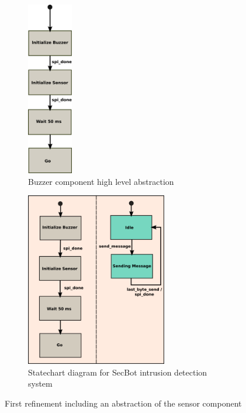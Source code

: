 \begin{figure}[t!]
    \begin{centering}
	    \begin{subfigure}[t]{0.5\textwidth}
	        \begin{centering}
	        \includegraphics[height=3in]{figures/Buzzer}
	        \caption{Buzzer component high level abstraction}
	        \label{fig:Buzzer}
	        \end{centering}
	    \end{subfigure}

	    \begin{subfigure}[t]{0.5\textwidth}
	        \begin{centering}
	        \includegraphics[height=3in]{figures/Buzzer&Sensor_1}
	        \caption{Statechart diagram for SecBot intrusion detection system}
	        \label{fig:BuzzerSensor_1}
	        \end{centering}
	    \end{subfigure}
	    \caption{First refinement including an abstraction of the sensor component}
    \end{centering}
\end{figure}

